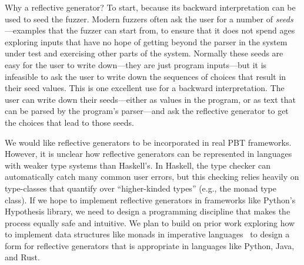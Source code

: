 Why a reflective generator?
To start,
because its backward interpretation can be used to seed the fuzzer.
Modern fuzzers often
ask the user for a number of {\em seeds}---examples that the fuzzer
can start from,
to ensure that it does not spend ages exploring
inputs that have no hope of getting beyond the parser in the system
under test and exercising other parts of the system. Normally these
seeds are easy
for the user to write down---they are just program inputs---but
it is infeasible to ask the user to write down the sequences of choices that
result in their seed values.
This is one excellent use for a
backward interpretation. The user can write down their seeds---either as values
in the program, or as text that can be parsed by the program's parser---and
ask the reflective generator to get the choices that lead to those seeds.



%
We would like reflective generators to be incorporated in
real PBT frameworks.
%
However, it is unclear
how reflective generators can be
represented in languages with weaker type systems than Haskell's. In
Haskell, the type checker can automatically catch many
common user errors, but this checking relies heavily on type-classes that
quantify over ``higher-kinded types'' (e.g., the monad type class). If
we hope to implement
reflective generators in frameworks like Python's Hypothesis library, we need to
design a programming discipline that makes the process equally safe and
intuitive. We plan to build on prior work exploring how to implement data structures
like monads in imperative
languages~\cite{brachthauser_representing_2021, delaat_pymonad_nodate} to design
a form for reflective generators that is appropriate in languages like
Python, Java, and Rust.

